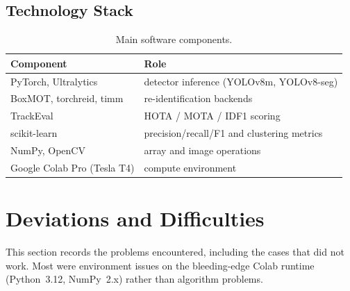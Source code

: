 \documentclass[12pt, a4paper]{article}
\begin{document}
\subsection{Technology Stack}
\begin{table}[H]
\centering
\caption{Main software components.}
\label{tab:stack}
\begin{tabular}{ll}
\toprule
\textbf{Component} & \textbf{Role} \\
\midrule
PyTorch, Ultralytics & detector inference (YOLOv8m, YOLOv8-seg) \\
BoxMOT, torchreid, timm & re-identification backends \\
TrackEval & HOTA / MOTA / IDF1 scoring \\
scikit-learn & precision/recall/F1 and clustering metrics \\
NumPy, OpenCV & array and image operations \\
Google Colab Pro (Tesla T4) & compute environment \\
\bottomrule
\end{tabular}
\end{table}

\section{Deviations and Difficulties}
\label{sec:difficulties}

This section records the problems encountered, including the cases that did not work. Most were
environment issues on the bleeding-edge Colab runtime (Python~3.12, NumPy~2.x) rather than algorithm
problems.
\end{document}

